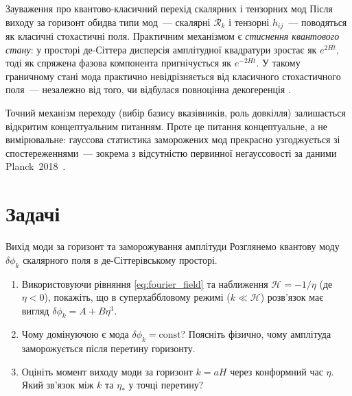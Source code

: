 \begin{keybox}{Зауваження про квантово-класичний перехід скалярних і тензорних мод}
Після виходу за горизонт обидва типи мод~--- скалярні
$\mathcal{R}_k$ і тензорні $h_{ij}$~--- поводяться як
класичні стохастичні поля. Практичним механізмом є
\emph{стиснення квантового стану}: у просторі де-Сіттера
дисперсія амплітудної квадратури зростає як $e^{2Ht}$,
тоді як спряжена фазова компонента пригнічується як
$e^{-2Ht}$. У такому граничному стані мода практично
невідрізняється від класичного стохастичного поля~---
незалежно від того, чи відбулася повноцінна декогеренція
\cite{polarski_starobinsky_1996, kiefer_polarski_1998}.

Точний механізм переходу (вибір базису вказівників, роль
довкілля) залишається відкритим концептуальним питанням.
Проте це питання концептуальне, а не вимірювальне: гауссова
статистика заморожених мод прекрасно узгоджується зі
спостереженнями~--- зокрема з відсутністю первинної
негауссовості за даними Planck~2018~\cite{planck_2018}.
\end{keybox}

\section*{Задачі}

\begin{problem}{Вихід моди за горизонт та заморожування амплітуди}
Розглянемо квантову моду $\delta\phi_k$ скалярного поля в де-Сіттерівському просторі.

\begin{enumerate}
    \item Використовуючи рівняння \eqref{eq:fourier_field} та наближення
          $\mathcal{H} = -1/\eta$ (де $\eta < 0$), покажіть, що в суперхаббловому
          режимі ($k \ll \mathcal{H}$) розв'язок має вигляд $\delta\phi_k = A + B\eta^3$.
    \item Чому домінуючою є мода $\delta\phi_k = \mathrm{const}$? Поясніть фізично,
          чому амплітуда заморожується після перетину горизонту.
    \item Оцініть момент виходу моди за горизонт $k = aH$ через конформний час $\eta$.
          Який зв'язок між $k$ та $\eta_*$ у точці перетину?
\end{enumerate}
\end{problem}

